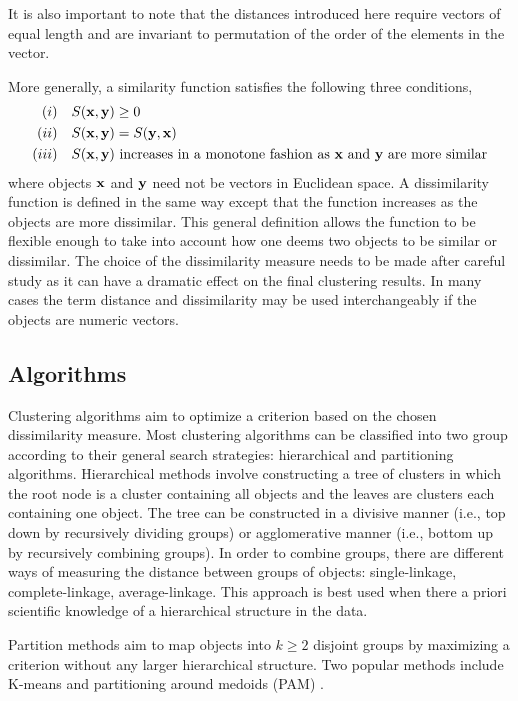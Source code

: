 It is also important to note that the distances introduced here require vectors of equal length and are invariant to permutation of the order of the elements in the vector.

More generally, a similarity function satisfies the following three conditions,
\begin{align*}
(i)&\quad S(\mathbf x,\mathbf y)\geq 0 \\
(ii)&\quad S(\mathbf x,\mathbf y) = S(\mathbf y,\mathbf x)\\
(iii)& \quad S(\mathbf x,\mathbf y)\text{ increases in a monotone fashion as }\mathbf x\text{ and }\mathbf y\text{ are more similar}
\end{align*}
where objects $\mathbf x$ and $\mathbf y$ need not be vectors in Euclidean space. A dissimilarity function is defined in the same way except that the function increases as the objects are more dissimilar. This general definition allows the function to be flexible enough to take into account how one deems two objects to be similar or dissimilar. The choice of the dissimilarity measure needs to be made after careful study as it can have a dramatic effect on the final clustering results. In many cases the term distance and dissimilarity may be used interchangeably if the objects are numeric vectors. 

\subsection{Algorithms}
Clustering algorithms aim to optimize a criterion based on the chosen dissimilarity measure. Most clustering algorithms can be classified into two group according to their general search strategies: hierarchical and partitioning algorithms. Hierarchical methods involve constructing a tree of clusters in which the root node is a cluster containing all objects and the leaves are clusters each containing one object. The tree can be constructed in a divisive manner (i.e., top down by recursively dividing groups) or agglomerative manner (i.e., bottom up by recursively combining groups). In order to combine groups, there are different ways of measuring the distance between groups of objects: single-linkage, complete-linkage, average-linkage. This approach is best used when there a priori scientific knowledge of a hierarchical structure in the data.

Partition methods aim to map objects into $k\geq 2$ disjoint groups by maximizing a criterion without any larger hierarchical structure. Two popular methods include K-means \cite{macqueen1967,hartigan1979} and partitioning around medoids (PAM) \cite{kaufman1990}. 

